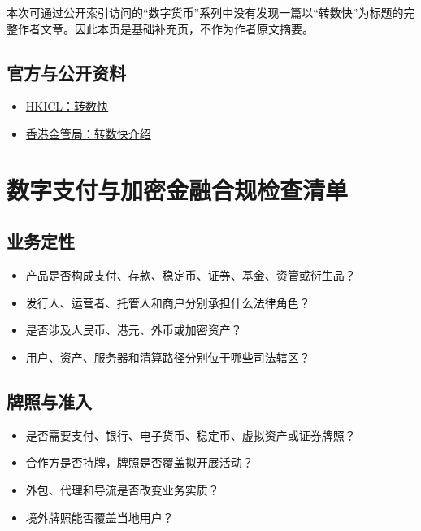 本次可通过公开索引访问的``数字货币''系列中没有发现一篇以``转数快''为标题的完整作者文章。因此本页是基础补充页，不作为作者原文摘要。

\section{官方与公开资料}\label{ux5b98ux65b9ux4e0eux516cux5f00ux8d44ux6599}

\begin{itemize}
\tightlist
\item
  \href{https://fps.hkicl.com.hk/schi/fps/index.php}{HKICL：转数快}
\item
  \href{https://www.hkma.gov.hk/}{香港金管局：转数快介绍}
\end{itemize}

\chapter{数字支付与加密金融合规检查清单}\label{ux6570ux5b57ux652fux4ed8ux4e0eux52a0ux5bc6ux91d1ux878dux5408ux89c4ux68c0ux67e5ux6e05ux5355}

\section{业务定性}\label{ux4e1aux52a1ux5b9aux6027}

\begin{itemize}
\tightlist
\item
  产品是否构成支付、存款、稳定币、证券、基金、资管或衍生品？
\item
  发行人、运营者、托管人和商户分别承担什么法律角色？
\item
  是否涉及人民币、港元、外币或加密资产？
\item
  用户、资产、服务器和清算路径分别位于哪些司法辖区？
\end{itemize}

\section{牌照与准入}\label{ux724cux7167ux4e0eux51c6ux5165}

\begin{itemize}
\tightlist
\item
  是否需要支付、银行、电子货币、稳定币、虚拟资产或证券牌照？
\item
  合作方是否持牌，牌照是否覆盖拟开展活动？
\item
  外包、代理和导流是否改变业务实质？
\item
  境外牌照能否覆盖当地用户？
\end{itemize}

